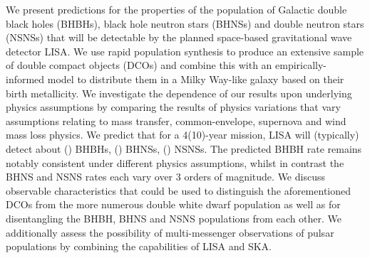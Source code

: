 We present predictions for the properties of the population of Galactic double black holes (BHBHs), black hole neutron stars (BHNSs) and double neutron stars (NSNSs) that will be detectable by the planned space-based gravitational wave detector LISA. We use rapid population synthesis to produce an extensive sample of double compact objects (DCOs) and combine this with an empirically-informed model to distribute them in a Milky Way-like galaxy based on their birth metallicity. We investigate the dependence of our results upon underlying physics assumptions by comparing the results of \nModels{} physics variations that vary assumptions relating to mass transfer, common-envelope, supernova and wind mass loss physics. We predict that for a 4(10)-year mission, LISA will (typically) detect about \BHBHFourYear{}(\BHBHTenYear{}) BHBHs, \BHNSFourYear{}(\BHNSTenYear{}) BHNSs, \NSNSFourYear{}(\NSNSTenYear{}) NSNSs. The predicted BHBH rate remains notably consistent under different physics assumptions, whilst in contrast the BHNS and NSNS rates each vary over 3 orders of magnitude. We discuss observable characteristics that could be used to distinguish the aforementioned DCOs from the more numerous double white dwarf population as well as for disentangling the BHBH, BHNS and NSNS populations from each other. We additionally assess the possibility of multi-messenger observations of pulsar populations by combining the capabilities of LISA and SKA.